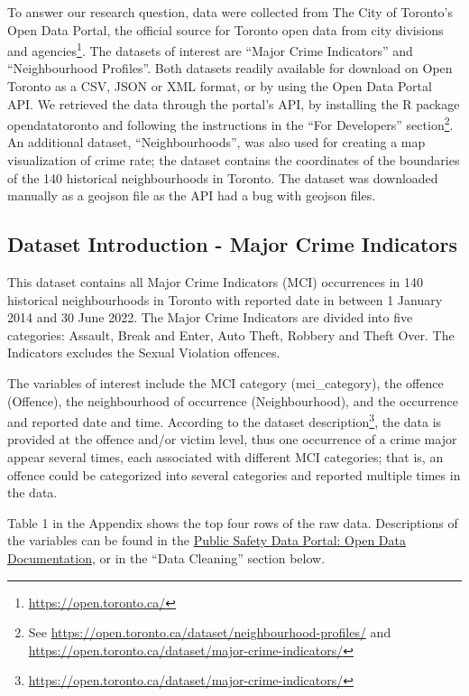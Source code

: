 \documentclass[
]{article}
\begin{document}
To answer our research question, data were collected from The City of
Toronto's Open Data Portal, the official source for Toronto open data
from city divisions and agencies\footnote{\url{https://open.toronto.ca/}}.
The datasets of interest are ``Major Crime Indicators'' and
``Neighbourhood Profiles''. Both datasets readily available for download
on Open Toronto as a CSV, JSON or XML format, or by using the Open Data
Portal API. We retrieved the data through the portal's API, by
installing the R package opendatatoronto and following the instructions
in the ``For Developers'' section\footnote{See
  \url{https://open.toronto.ca/dataset/neighbourhood-profiles/} and
  \url{https://open.toronto.ca/dataset/major-crime-indicators/}}. An
additional dataset, ``Neighbourhoods'', was also used for creating a map
visualization of crime rate; the dataset contains the coordinates of the
boundaries of the 140 historical neighbourhoods in Toronto. The dataset
was downloaded manually as a geojson file as the API had a bug with
geojson files.

\hypertarget{dataset-introduction---major-crime-indicators}{%
\subsection{Dataset Introduction - Major Crime
Indicators}\label{dataset-introduction---major-crime-indicators}}

This dataset contains all Major Crime Indicators (MCI) occurrences in
140 historical neighbourhoods in Toronto with reported date in between 1
January 2014 and 30 June 2022. The Major Crime Indicators are divided
into five categories: Assault, Break and Enter, Auto Theft, Robbery and
Theft Over. The Indicators excludes the Sexual Violation offences.

The variables of interest include the MCI category (mci\_category), the
offence (Offence), the neighbourhood of occurrence (Neighbourhood), and
the occurrence and reported date and time. According to the dataset
description\footnote{\url{https://open.toronto.ca/dataset/major-crime-indicators/}},
the data is provided at the offence and/or victim level, thus one
occurrence of a crime major appear several times, each associated with
different MCI categories; that is, an offence could be categorized into
several categories and reported multiple times in the data.

Table 1 in the Appendix shows the top four rows of the raw data.
Descriptions of the variables can be found in the
\href{https://torontops.maps.arcgis.com/sharing/rest/content/items/c0b17f1888544078bf650f3b8b04d35d/data}{Public
Safety Data Portal: Open Data Documentation}, or in the ``Data
Cleaning'' section below.
\end{document}
